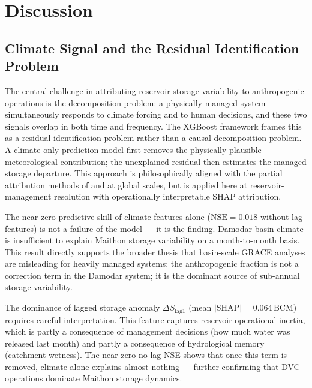 \documentclass[preprint,12pt,authoryear]{elsarticle}
\newcommand{\dS}{\Delta S}
\newcommand{\BCM}{\,\mathrm{BCM}}
\newcommand{\NSE}{\mathrm{NSE}}
\begin{document}
\section{Discussion}
\label{sec:discussion}

\subsection{Climate Signal and the Residual Identification Problem}
\label{sec:disc_residual}

The central challenge in attributing reservoir storage variability to
anthropogenic operations is the decomposition problem: a physically managed
system simultaneously responds to climate forcing and to human decisions, and
these two signals overlap in both time and frequency. The XGBoost framework
frames this as a residual identification problem rather than a causal
decomposition problem. A climate-only prediction model first removes the
physically plausible meteorological contribution; the unexplained residual
then estimates the managed storage departure. This approach is philosophically
aligned with the partial attribution methods of \citet{Ji2023} and
\citet{Wada2017} at global scales, but is applied here at
reservoir-management resolution with operationally interpretable SHAP
attribution.

The near-zero predictive skill of climate features alone ($\NSE = 0.018$
without lag features) is not a failure of the model --- it is the finding.
Damodar basin climate is insufficient to explain Maithon storage variability
on a month-to-month basis. This result directly supports the broader thesis
that basin-scale GRACE analyses are misleading for heavily managed systems:
the anthropogenic fraction is not a correction term in the Damodar system;
it is the dominant source of sub-annual storage variability.

The dominance of lagged storage anomaly $\dS_{\text{lag1}}$ (mean
$|\text{SHAP}| = 0.064\BCM$) requires careful interpretation. This feature
captures reservoir operational inertia, which is partly a consequence of
management decisions (how much water was released last month) and partly a
consequence of hydrological memory (catchment wetness). The near-zero
no-lag NSE shows that once this term is removed, climate alone explains
almost nothing --- further confirming that DVC operations dominate Maithon
storage dynamics.
\end{document}
